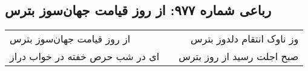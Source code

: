 \begin{center}
\section*{رباعی شماره ۹۷۷: از روز قیامت جهان‌سوز بترس}
\label{sec:0977}
\begin{longtable}{l p{0.5cm} r}
از روز قیامت جهان‌سوز بترس
&&
وز ناوک انتقام دلدوز بترس
\\
ای در شب حرص خفته در خواب دراز
&&
صبح اجلت رسید از روز بترس
\\
\end{longtable}
\end{center}
